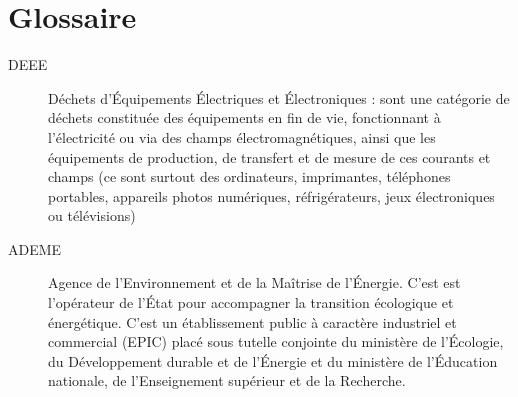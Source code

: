 \chapter{Glossaire}

\begin{description}

\item[DEEE] Déchets d’Équipements Électriques et Électroniques : sont une catégorie de déchets constituée des équipements en fin de vie, fonctionnant à l'électricité ou via des champs électromagnétiques, ainsi que les équipements de production, de transfert et de mesure de ces courants et champs (ce sont surtout des ordinateurs, imprimantes, téléphones portables, appareils photos numériques, réfrigérateurs, jeux électroniques ou télévisions) 

\item[ADEME] Agence de l’Environnement et de la Maîtrise de l’Énergie. C'est est l'opérateur de l'État pour accompagner la transition écologique et énergétique. C'est un établissement public à caractère industriel et commercial (EPIC) placé sous tutelle conjointe du ministère de l’Écologie, du Développement durable et de l’Énergie et du ministère de l’Éducation nationale, de l’Enseignement supérieur et de la Recherche.

\end{description}